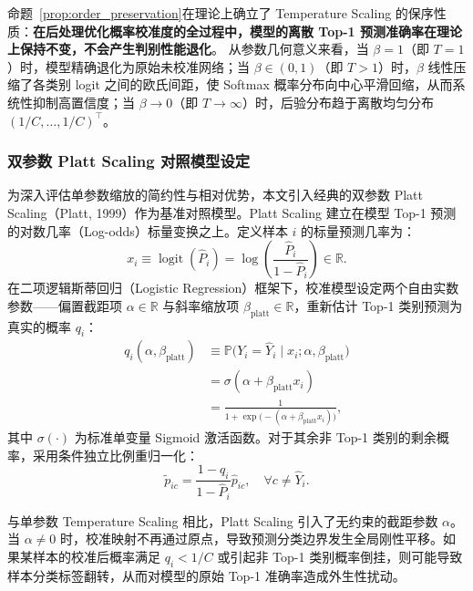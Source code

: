 命题~\ref{prop:order_preservation}在理论上确立了 Temperature Scaling 的保序性质：\textbf{在后处理优化概率校准度的全过程中，模型的离散 Top-1 预测准确率在理论上保持不变，不会产生判别性能退化}。
从参数几何意义来看，当 $\beta = 1$（即 $T = 1$）时，模型精确退化为原始未校准网络；当 $\beta \in (0, 1)$（即 $T > 1$）时，$\beta$ 线性压缩了各类别 logit 之间的欧氏间距，使 Softmax 概率分布向中心平滑回缩，从而系统性抑制高置信度；当 $\beta \to 0$（即 $T \to \infty$）时，后验分布趋于离散均匀分布 $(1/C, \dots, 1/C)^\top$。

\subsubsection{双参数 Platt Scaling 对照模型设定}

为深入评估单参数缩放的简约性与相对优势，本文引入经典的双参数 Platt Scaling（Platt, 1999）作为基准对照模型。Platt Scaling 建立在模型 Top-1 预测的对数几率（Log-odds）标量变换之上。定义样本 $i$ 的标量预测几率为：
\begin{equation}\label{eq:log_odds}
x_i \equiv \operatorname{logit}(\hat P_i) = \log\left(\frac{\hat P_i}{1 - \hat P_i}\right) \in \mathbb{R}.
\end{equation}
在二项逻辑斯蒂回归（Logistic Regression）框架下，校准模型设定两个自由实数参数——偏置截距项 $\alpha \in \mathbb{R}$ 与斜率缩放项 $\beta_{\mathrm{platt}} \in \mathbb{R}$，重新估计 Top-1 类别预测为真实的概率 $q_i$：
\begin{equation}\label{eq:platt_formula}
\begin{split}
q_i(\alpha, \beta_{\mathrm{platt}}) &\equiv \mathbb{P}\big(Y_i = \hat Y_i \;\big|\; x_i; \alpha, \beta_{\mathrm{platt}}\big) \\
&= \sigma(\alpha + \beta_{\mathrm{platt}} x_i) \\
&= \frac{1}{1 + \exp\big(-(\alpha + \beta_{\mathrm{platt}} x_i)\big)},
\end{split}
\end{equation}
其中 $\sigma(\cdot)$ 为标准单变量 Sigmoid 激活函数。对于其余非 Top-1 类别的剩余概率，采用条件独立比例重归一化：
\begin{equation}\label{eq:platt_renorm}
\tilde p_{ic} = \frac{1 - q_i}{1 - \hat P_i} \hat p_{ic}, \quad \forall c \ne \hat Y_i.
\end{equation}

与单参数 Temperature Scaling 相比，Platt Scaling 引入了无约束的截距参数 $\alpha$。当 $\alpha \ne 0$ 时，校准映射不再通过原点，导致预测分类边界发生全局刚性平移。如果某样本的校准后概率满足 $q_i < 1/C$ 或引起非 Top-1 类别概率倒挂，则可能导致样本分类标签翻转，从而对模型的原始 Top-1 准确率造成外生性扰动。

